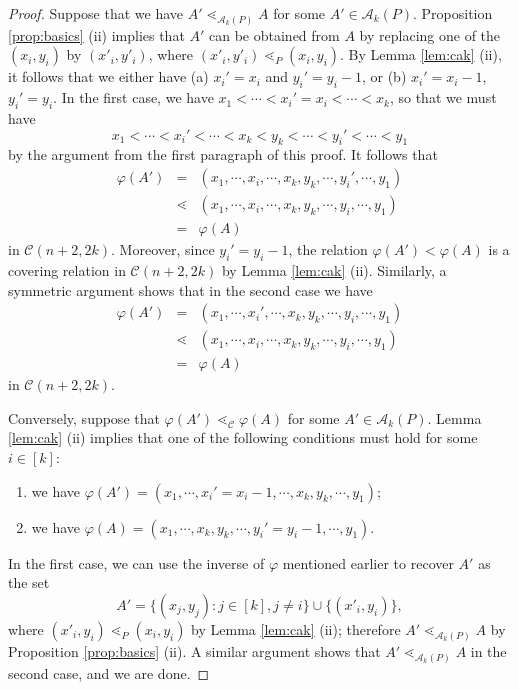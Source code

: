 \documentclass[10pt,a4paper]{amsart}
\newcommand{\akp}{\mathcal{A}_k(P)}
\newcommand{\cala}{\mathcal{A}}
\newcommand{\calc}{\mathcal{C}}
\begin{document}
\begin{proof}
Suppose that we have $A' \lessdot_{\cala_k(P)} A$ for some $A'\in \akp$.
Proposition \ref{prop:basics} (ii) implies that $A'$ can be obtained from $A$ by
replacing one of the $(x_i, y_i)$ by $(x'_i, y'_i)$, where $(x'_i, y'_i)
\lessdot_P (x_i, y_i)$. By Lemma \ref{lem:cak} (ii), it follows that we
either have (a) $x_i'=x_i$ and $y_i'=y_i-1$, or (b) $x_i'=x_i-1$, $y_i'=y_i$.
In the first case, we have $x_1<\cdots< x_i'=x_i< \cdots<x_k$, so that we must
have 
\[ x_1<\cdots<x_i'<\cdots< x_k<y_k<\cdots <y_i'<\cdots<y_1 \] 
by the argument from the first paragraph of this proof. It follows that 
\begin{eqnarray*} 
\varphi(A')&=&(x_1,\cdots,x_i, \cdots,x_k, y_k, \cdots,y_i', \cdots,  y_1) \\ 
      &\lessdot&(x_1,\cdots,x_i, \cdots,x_k, y_k, \cdots,y_i, \cdots, y_1)\\ 
      &=&\varphi(A) \end{eqnarray*} 
in $\calc(n+2,2k)$. Moreover, since $y_i'=y_i-1$, the relation
$\varphi(A')<\varphi(A)$ is a covering relation in $\calc(n+2,2k)$ by Lemma
\ref{lem:cak} (ii).  Similarly, a symmetric argument shows that in the second
case we have 
\begin{eqnarray*} 
\varphi(A')&=&(x_1,\cdots,x_i', \cdots,x_k,y_k, \cdots,y_i, \cdots,  y_1) \\ 
&\lessdot&(x_1,\cdots,x_i, \cdots,x_k, y_k, \cdots,y_i, \cdots,  y_1)\\ 
&=&\varphi(A) 
\end{eqnarray*} 
in $\calc(n+2,2k)$. 

Conversely, suppose that $\varphi(A')\lessdot_\calc \varphi(A)$ for some $A'\in
\akp$.  Lemma \ref{lem:cak} (ii) implies that one of the following conditions
must hold for some $i\in [k]$:

\begin{enumerate}
\item we have $\varphi(A')=(x_1, \cdots, x_i'=x_i-1, \cdots, x_k,y_k,\cdots, y_1)$; 
\item we have $\varphi(A)=(x_1, \cdots, x_k,y_k,\cdots,y_i'=y_i-1,\cdots, y_1)$. 
\end{enumerate} 

In the first case, we can use the inverse of $\varphi$ mentioned earlier to
recover $A'$ as the set $$ A'=\{(x_j,y_j):j\in [k], j\neq i\}\cup\{(x'_i,y_i)\}
,$$ where $(x'_i,y_i)\lessdot_P (x_i,y_i)$ by Lemma \ref{lem:cak} (ii); therefore $A'\lessdot_{\akp} A$ by Proposition \ref{prop:basics} (ii).  A
similar argument shows that $A'\lessdot_{\akp} A$ in the second case, and we are
done.
 \end{proof}
\end{document}

